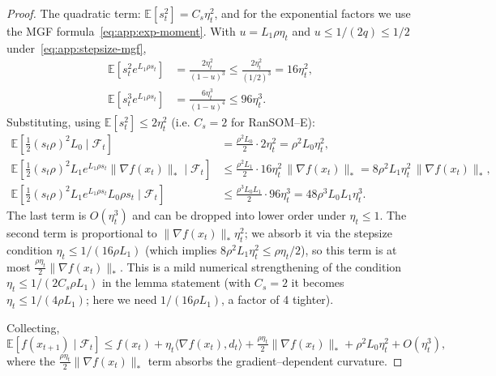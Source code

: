 \documentclass{article}
\theoremstyle{plain}
\theoremstyle{definition}
\theoremstyle{remark}
\begin{document}
\begin{proof}
The quadratic term: $\mathbb{E}[s_t^2] = C_s \eta_t^2$, and for the
exponential factors we use the MGF
formula~\eqref{eq:app:exp-moment}. With $u = L_1\rho\eta_t$ and $u \leq
1/(2q) \leq 1/2$ under~\eqref{eq:app:stepsize-mgf},
\begin{align*}
  \mathbb{E}[s_t^2 e^{L_1\rho s_t}]
  &= \frac{2\eta_t^2}{(1-u)^3}
  \leq \frac{2\eta_t^2}{(1/2)^3} = 16\eta_t^2,
  \\
  \mathbb{E}[s_t^3 e^{L_1\rho s_t}]
  &= \frac{6\eta_t^3}{(1-u)^4}
  \leq 96\eta_t^3.
\end{align*}
Substituting, using $\mathbb{E}[s_t^2] \leq 2\eta_t^2$ (i.e. $C_s = 2$
for RanSOM--E):
\begin{align*}
  \mathbb{E}\!\left[\tfrac12 (s_t\rho)^2 L_0 \mid \mathcal{F}_t\right]
  &= \tfrac{\rho^2 L_0}{2}\cdot 2\eta_t^2 = \rho^2 L_0 \eta_t^2,
  \\
  \mathbb{E}\!\left[\tfrac12 (s_t\rho)^2 L_1 e^{L_1\rho s_t}
    \|\nabla f(x_t)\|_* \mid \mathcal{F}_t\right]
  &\leq \tfrac{\rho^2 L_1}{2}\cdot 16\eta_t^2\, \|\nabla f(x_t)\|_*
  = 8\rho^2 L_1 \eta_t^2\, \|\nabla f(x_t)\|_*,
  \\
  \mathbb{E}\!\left[\tfrac12 (s_t\rho)^2 L_1 e^{L_1\rho s_t} L_0\rho s_t
    \mid \mathcal{F}_t\right]
  &\leq \tfrac{\rho^3 L_0 L_1}{2}\cdot 96\eta_t^3
  = 48\rho^3 L_0 L_1 \eta_t^3.
\end{align*}
The last term is $O(\eta_t^3)$ and can be dropped into lower order under
$\eta_t \leq 1$. The second term is proportional to $\|\nabla f(x_t)\|_*
\eta_t^2$; we absorb it via the stepsize condition $\eta_t \leq 1/(16
\rho L_1)$ (which implies $8\rho^2 L_1\eta_t^2 \leq \rho\eta_t/2$), so
this term is at most $\tfrac{\rho\eta_t}{2}\|\nabla f(x_t)\|_*$. This is
a mild numerical strengthening of the condition $\eta_t \leq 1/(2 C_s
\rho L_1)$ in the lemma statement (with $C_s = 2$ it becomes $\eta_t
\leq 1/(4\rho L_1)$; here we need $1/(16\rho L_1)$, a factor of 4
tighter).

Collecting,
\begin{equation}
  \mathbb{E}[f(x_{t+1}) \mid \mathcal{F}_t]
  \leq f(x_t) + \eta_t\langle\nabla f(x_t), d_t\rangle
    + \tfrac{\rho\eta_t}{2}\|\nabla f(x_t)\|_*
    + \rho^2 L_0 \eta_t^2 + O(\eta_t^3),
  \label{eq:app:desc-step2}
\end{equation}
where the $\tfrac{\rho\eta_t}{2}\|\nabla f(x_t)\|_*$ term absorbs the
gradient--dependent curvature.


\end{proof}
\end{document}
